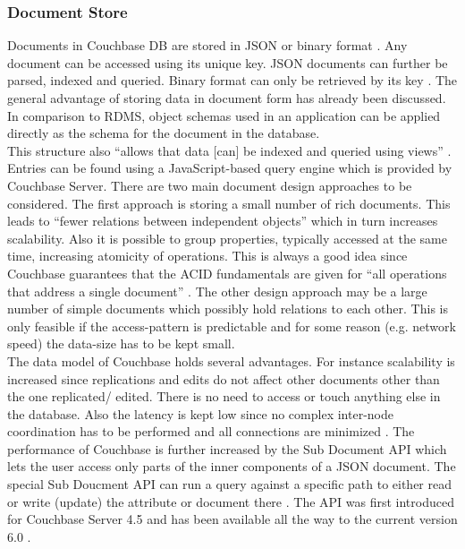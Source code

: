 \subsubsection{Document Store}
Documents in Couchbase DB are stored in JSON \parencite{objelean} or binary format \parencite{couchbaseDocuData}. Any document can be accessed using its unique key. JSON documents can further be parsed, indexed and queried. Binary format can only be retrieved by its key \parencite{couchbaseDocuData}. The general advantage of storing data in document form has already been discussed. In comparison to RDMS, object schemas used in an application can be applied directly as the schema for the document in the database.\\
This structure also “allows that data [can] be indexed and queried using views” \parencite{objelean}. Entries can be found using a JavaScript-based query engine which is provided by Couchbase Server. There are two main document design approaches to be considered. The first approach is storing a small number of rich documents. This leads to \enquote{fewer relations between independent objects} \parencite{couchbaseDocuDataModel} which in turn increases scalability. Also it is possible to group properties, typically accessed at the same time, increasing atomicity of operations. This is always a good idea since Couchbase guarantees that the ACID fundamentals are given for \enquote{all operations that address a single document} \parencite{couchbaseDocuDataModel}. The other design approach may be a large number of simple documents which possibly hold relations to each other. This is only feasible if the access-pattern is predictable and for some reason (e.g. network speed) the data-size has to be kept small. \\
The data model of Couchbase holds several advantages. For instance scalability is increased since replications and edits do not affect other documents other than the one replicated/ edited. There is no need to access or touch anything else in the database. Also the latency is kept low since no complex inter-node coordination has to be performed and all connections are minimized \parencite{couchbaseDocuDataModel}. The performance of Couchbase is further increased by the Sub Document API which lets the user access only parts of the inner components of a JSON document. The special Sub Doucment API can run a query against a specific path to either read or write (update) the attribute or document there \parencite{couchbaseDocuSubDoc}. The API was first introduced for Couchbase Server 4.5 and has been available all the way to the current version 6.0 \parencite{couchbaseDocuSubDoc}.
